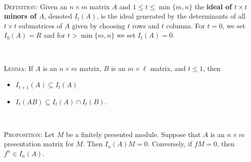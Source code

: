 \documentclass[12pt]{amsart}
\newcommand{\1}{\mathbbm{1}}
\begin{document}
\begin{framed}
\

\noindent \textsc{Definition:} Given an $n\times m$ matrix $A$ and $1\leq t \leq \min\{m,n\}$ the \textbf{ideal of $t\times t$ minors of $A$}, denoted $I_t(A)$, is the ideal generated by the determinants of all $t\times t$ submatrices of $A$ given by choosing $t$ rows and $t$ columns. For $t=0$, we set $I_0(A)=R$ and for $t>\min\{m,n\}$ we set $I_t(A)=0$.


\

\noindent \textsc{Lemma:} If $A$ is an $n\times m$ matrix, $B$ is an $m \times \ell$ matrix, and $t\leq 1$, then
\begin{itemize}
\item $I_{t+1}(A) \subseteq I_t(A)$
\item ${I_t(AB) \subseteq I_t(A) \cap I_t(B)}$.
\end{itemize}



\

\noindent \textsc{Proposition:} Let $M$ be a finitely presented module. Suppose that $A$ is an $n\times m$ presentation matrix for $M$. Then $I_n(A) M = 0$. Conversely, if $f M=0$, then $f^n\in I_n(A)$.

 
 \end{framed}
 
\end{document}
